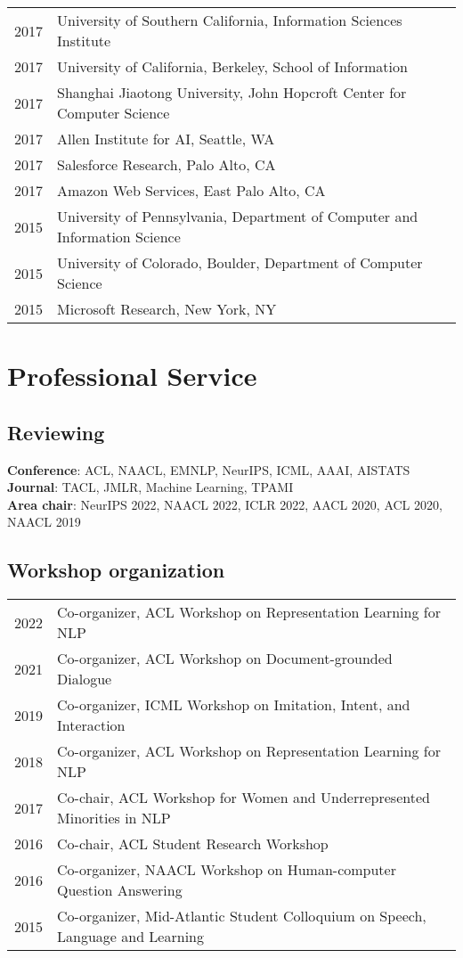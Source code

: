 \documentclass[a4paper,11pt]{article}
\begin{document}
\begin{longtable}{rl}
    2017 & University of Southern California, Information Sciences Institute \\
    2017 & University of California, Berkeley, School of Information \\
    2017 & Shanghai Jiaotong University, John Hopcroft Center for Computer Science \\
    2017 & Allen Institute for AI, Seattle, WA \\
    2017 & Salesforce Research, Palo Alto, CA \\
    2017 & Amazon Web Services, East Palo Alto, CA \\
    2015 & University of Pennsylvania, Department of Computer and Information Science \\
    2015 & University of Colorado, Boulder, Department of Computer Science \\
    2015 & Microsoft Research, New York, NY \\
\end{longtable}

\section{Professional Service}
\subsection{Reviewing}
\textbf{Conference}: ACL, NAACL, EMNLP, NeurIPS, ICML, AAAI, AISTATS \\
\textbf{Journal}: TACL, JMLR, Machine Learning, TPAMI \\
\textbf{Area chair}: NeurIPS 2022, NAACL 2022, ICLR 2022, AACL 2020, ACL 2020, NAACL 2019

\subsection{Workshop organization}
\begin{longtable}{rl}
2022 & Co-organizer, ACL Workshop on Representation Learning for NLP \\
2021 & Co-organizer, ACL Workshop on Document-grounded Dialogue \\
2019 & Co-organizer, ICML Workshop on Imitation, Intent, and Interaction \\
2018 & Co-organizer, ACL Workshop on Representation Learning for NLP \\
2017 & Co-chair, ACL Workshop for Women and Underrepresented Minorities in NLP \\
2016 & Co-chair, ACL Student Research Workshop \\
2016 & Co-organizer, NAACL Workshop on Human-computer Question Answering \\
2015 & Co-organizer, Mid-Atlantic Student Colloquium on Speech, Language and Learning
\end{longtable}
\end{document}
